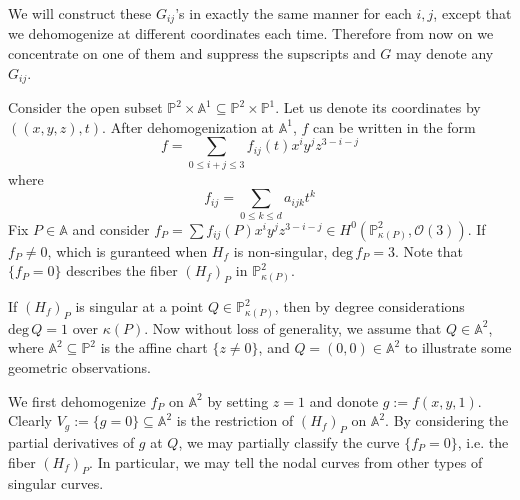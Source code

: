 \documentclass[12pt]{article}
\theoremstyle{plain}
\theoremstyle{definition}
\newcommand{\IA}{\mathbb{A}}
\newcommand{\IP}{\mathbb{P}}
\newcommand{\sO}{\mathcal{O}}
\renewcommand{\deg}{\mathrm{deg}\,}
\newcommand{\<}{\langle}
\renewcommand{\>}{\rangle}
\begin{document}
We will construct these $G_{ij}$'s in exactly the same manner for each $i, j$, except that we dehomogenize at different coordinates each time. Therefore from now on we concentrate on one of them and suppress the supscripts and $G$ may denote any $G_{ij}$.  

Consider the open subset $\IP^2 \times \IA^1 \subseteq \IP^2 \times \IP^1$. Let us denote its coordinates by $((x, y, z), t)$. After dehomogenization at $\IA^1$, $f$ can be written in the form
$$ f = \sum_{0 \le i + j \le 3} f_{ij}(t) x^i y^j z^{3 - i - j} $$ where 
$$ f_{ij} = \sum_{0 \le k \le d} a_{ijk} t^k $$
Fix $P \in \IA$ and consider $f_P = \sum f_{ij}(P) x^i y^j z^{3 - i - j} \in H^0(\IP^2_{\kappa(P)}, \sO(3))$. If $f_P \neq 0$, which is guranteed when $H_f$ is non-singular, $\deg f_P = 3$. Note that $\{f_P = 0 \}$ describes the fiber $(H_f)_P$ in $\IP^2_{\kappa(P)}$. 

If $(H_f)_P$ is singular at a point $Q \in \IP^2_{\kappa(P)}$, then by degree considerations $\deg Q = 1$ over $\kappa(P)$. Now without loss of generality, we assume that $Q \in \IA^2$, where $\IA^2 \subseteq \IP^2$ is the affine chart $\{z \neq 0\}$, and $Q = (0, 0) \in \IA^2$ to illustrate some geometric observations. 

We first dehomogenize $f_P$ on $\IA^2$ by setting $z = 1$ and donote $g := f(x, y, 1)$. Clearly $V_g := \{ g = 0 \} \subseteq \IA^2$ is the restriction of $(H_f)_P$ on $\IA^2$. By considering the partial derivatives of $g$ at $Q$, we may partially classify the curve $\{ f_P = 0 \}$, i.e. the fiber $(H_f)_P$. In particular, we may tell the nodal curves from other types of singular curves. 
\end{document}
